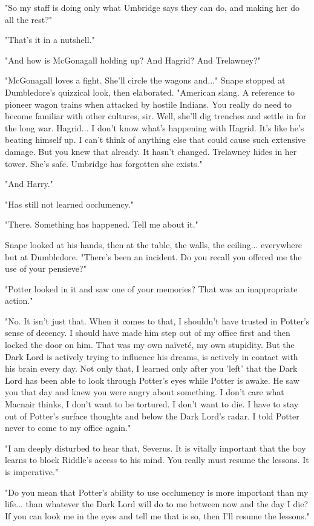 \documentclass[a4paper,11pt]{article}
\begin{document}
"So my staff is doing only what Umbridge says they can do, and making her do all the rest?"

"That's it in a nutshell."

"And how is McGonagall holding up? And Hagrid? And Trelawney?"

"McGonagall loves a fight. She'll circle the wagons and..." Snape stopped at Dumbledore's quizzical look, then elaborated. "American slang. A reference to pioneer wagon trains when attacked by hostile Indians. You really do need to become familiar with other cultures, sir. Well, she'll dig trenches and settle in for the long war. Hagrid... I don't know what's happening with Hagrid. It's like he's beating himself up. I can't think of anything else that could cause such extensive damage. But you knew that already. It hasn't changed. Trelawney hides in her tower. She's safe. Umbridge has forgotten she exists."

"And Harry."

"Has still not learned occlumency."

"There. Something has happened. Tell me about it."

Snape looked at his hands, then at the table, the walls, the ceiling... everywhere but at Dumbledore. "There's been an incident. Do you recall you offered me the use of your pensieve?"

"Potter looked in it and saw one of your memories? That was an inappropriate action."

"No. It isn't just that. When it comes to that, I shouldn't have trusted in Potter's sense of decency. I should have made him step out of my office first and then locked the door on him. That was my own naïveté, my own stupidity. But the Dark Lord is actively trying to influence his dreams, is actively in contact with his brain every day. Not only that, I learned only after you 'left' that the Dark Lord has been able to look through Potter's eyes while Potter is awake. He saw you that day and knew you were angry about something. I don't care what Macnair thinks, I don't want to be tortured. I don't want to die. I have to stay out of Potter's surface thoughts and below the Dark Lord's radar. I told Potter never to come to my office again."

"I am deeply disturbed to hear that, Severus. It is vitally important that the boy learns to block Riddle's access to his mind. You really must resume the lessons. It is imperative."

"Do you mean that Potter's ability to use occlumency is more important than my life... than whatever the Dark Lord will do to me between now and the day I die? If you can look me in the eyes and tell me that is so, then I'll resume the lessons."
\end{document}
